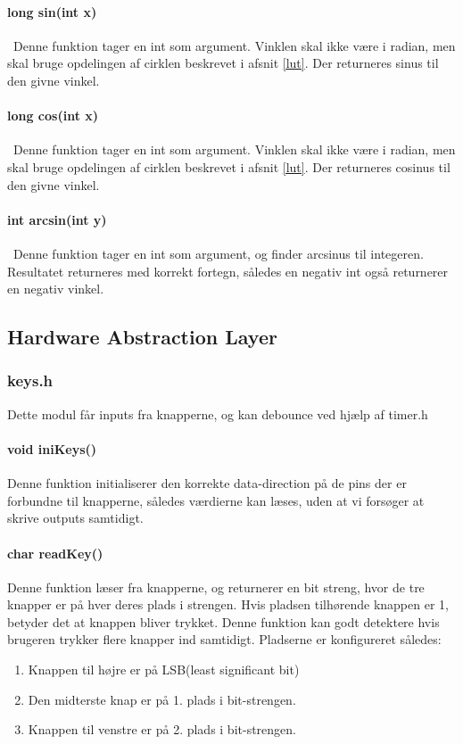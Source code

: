 \paragraph{long sin(int x)}\
Denne funktion tager en int som argument. Vinklen skal ikke være i radian, men skal bruge opdelingen af cirklen beskrevet i afsnit \ref{lut}. Der returneres sinus til den givne vinkel.
\paragraph{long cos(int x)}\
Denne funktion tager en int som argument. Vinklen skal ikke være i radian, men skal bruge opdelingen af cirklen beskrevet i afsnit \ref{lut}. Der returneres cosinus til den givne vinkel.
\paragraph{int arcsin(int y)}\
Denne funktion tager en int som argument, og finder arcsinus til integeren. Resultatet returneres med korrekt fortegn, således en negativ int også returnerer en negativ vinkel.
\subsection{Hardware Abstraction Layer}
\subsubsection{keys.h}
Dette modul får inputs fra knapperne, og kan debounce ved hjælp af timer.h
\paragraph{void iniKeys()}
Denne funktion initialiserer den korrekte data-direction på de pins der er forbundne til knapperne, således værdierne kan læses, uden at vi forsøger at skrive outputs samtidigt.

\paragraph{char readKey()}
Denne funktion læser fra knapperne, og returnerer en bit streng, hvor de tre knapper er på hver deres plads i strengen. Hvis pladsen tilhørende knappen er 1, betyder det at knappen bliver trykket. Denne funktion kan godt detektere hvis brugeren trykker flere knapper ind samtidigt. Pladserne er konfigureret således:
\begin{enumerate}
\item Knappen til højre er på LSB(least significant bit)
\item Den midterste knap er på 1. plads i bit-strengen.
\item Knappen til venstre er på 2. plads i bit-strengen.
\end{enumerate}

